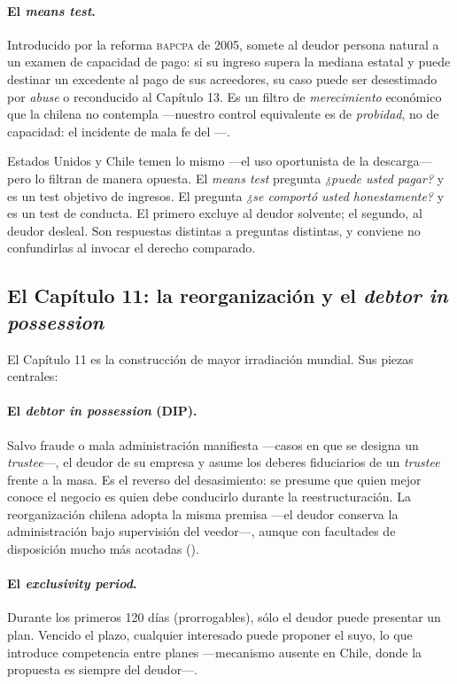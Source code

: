 \paragraph{El \emph{means test}.} Introducido por la reforma \textsc{bapcpa} de 2005, somete al
deudor persona natural a un examen de capacidad de pago: si su ingreso supera la mediana estatal y
puede destinar un excedente al pago de sus acreedores, su caso puede ser desestimado por
\emph{abuse} o reconducido al Capítulo 13. Es un filtro de \emph{merecimiento} económico que la
\LIR{} chilena no contempla ---nuestro control equivalente es de \emph{probidad}, no de capacidad:
el incidente de mala fe del ---.

\begin{foco}
Estados Unidos y Chile temen lo mismo ---el uso oportunista de la descarga--- pero lo filtran de
manera opuesta. El \emph{means test} pregunta \emph{¿puede usted pagar?} y es un test objetivo de
ingresos. El  pregunta \emph{¿se comportó usted honestamente?} y es un test de conducta.
El primero excluye al deudor solvente; el segundo, al deudor desleal. Son respuestas distintas a
preguntas distintas, y conviene no confundirlas al invocar el derecho comparado.
\end{foco}

\subsection{El Capítulo 11: la reorganización y el \emph{debtor in possession}}

El Capítulo 11 es la construcción de mayor irradiación mundial. Sus piezas centrales:

\paragraph{El \emph{debtor in possession} (DIP).} Salvo fraude o mala administración manifiesta
---casos en que se designa un \emph{trustee}---, el deudor  de
su empresa y asume los deberes fiduciarios de un \emph{trustee} frente a la masa. Es el reverso del
desasimiento: se presume que quien mejor conoce el negocio es quien debe conducirlo durante la
reestructuración. La reorganización chilena adopta la misma premisa ---el deudor conserva la
administración bajo supervisión del veedor---, aunque con facultades de disposición mucho más
acotadas ().

\paragraph{El \emph{exclusivity period}.} Durante los primeros 120 días (prorrogables), sólo el
deudor puede presentar un plan. Vencido el plazo, cualquier interesado puede proponer el suyo, lo
que introduce competencia entre planes ---mecanismo ausente en Chile, donde la propuesta es siempre
del deudor---.

